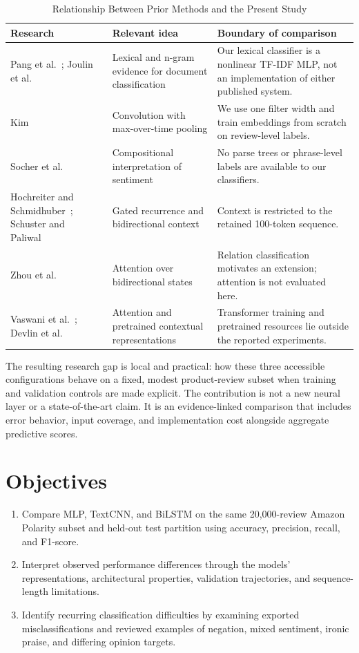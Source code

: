 \begin{table}[tbp]
\fontsize{9}{10.2}\selectfont
\centering
\caption{Relationship Between Prior Methods and the Present Study}
\label{tab:literature}
\renewcommand{\arraystretch}{1.10}\setlength{\tabcolsep}{4pt}
\begin{tabularx}{\linewidth}{@{}P{32mm}P{48mm}Y@{}}
\toprule
Research & Relevant idea & Boundary of comparison \\ \midrule
Pang et al.~\cite{pang2002}; Joulin et al.~\cite{joulin2017} & Lexical and n-gram evidence for document classification & Our lexical classifier is a nonlinear TF-IDF MLP, not an implementation of either published system. \\
Kim~\cite{kim2014} & Convolution with max-over-time pooling & We use one filter width and train embeddings from scratch on review-level labels. \\
Socher et al.~\cite{socher2013} & Compositional interpretation of sentiment & No parse trees or phrase-level labels are available to our classifiers. \\
Hochreiter and Schmidhuber~\cite{hochreiter1997}; Schuster and Paliwal~\cite{schuster1997} & Gated recurrence and bidirectional context & Context is restricted to the retained 100-token sequence. \\
Zhou et al.~\cite{zhou2016} & Attention over bidirectional states & Relation classification motivates an extension; attention is not evaluated here. \\
Vaswani et al.~\cite{vaswani2017}; Devlin et al.~\cite{devlin2019} & Attention and pretrained contextual representations & Transformer training and pretrained resources lie outside the reported experiments. \\
\bottomrule
\end{tabularx}
\end{table}

The resulting research gap is local and practical: how these three accessible configurations behave on a fixed, modest product-review subset when training and validation controls are made explicit. The contribution is not a new neural layer or a state-of-the-art claim. It is an evidence-linked comparison that includes error behavior, input coverage, and implementation cost alongside aggregate predictive scores.


\section{Objectives}
\begin{enumerate}
\item Compare MLP, TextCNN, and BiLSTM on the same 20,000-review Amazon Polarity subset and held-out test partition using accuracy, precision, recall, and F1-score.
\item Interpret observed performance differences through the models' representations, architectural properties, validation trajectories, and sequence-length limitations.
\item Identify recurring classification difficulties by examining exported misclassifications and reviewed examples of negation, mixed sentiment, ironic praise, and differing opinion targets.
\end{enumerate}

